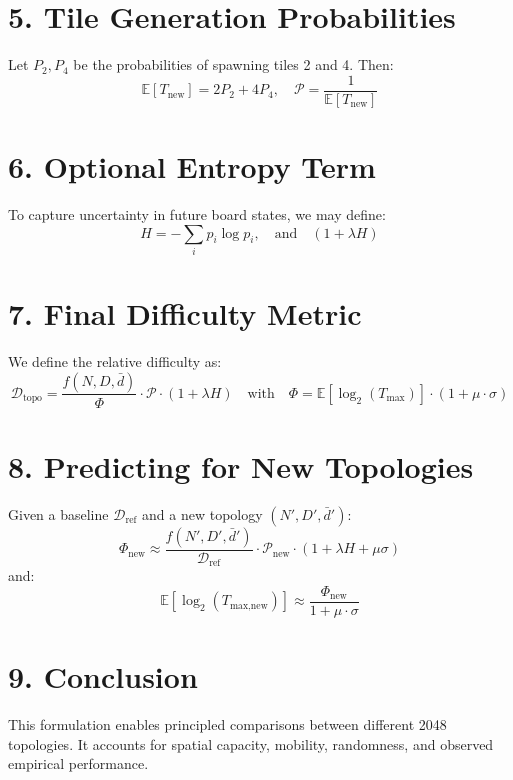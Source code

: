 \documentclass[12pt]{article}
\begin{document}
\section*{5. Tile Generation Probabilities}
Let $P_2, P_4$ be the probabilities of spawning tiles 2 and 4. Then:
\[
\mathbb{E}[T_{\text{new}}] = 2P_2 + 4P_4, \quad \mathcal{P} = \frac{1}{\mathbb{E}[T_{\text{new}}]}
\]

\section*{6. Optional Entropy Term}
To capture uncertainty in future board states, we may define:
\[
H = -\sum_i p_i \log p_i, \quad \text{and} \quad (1 + \lambda H)
\]

\section*{7. Final Difficulty Metric}
We define the relative difficulty as:
\[
\boxed{
\mathcal{D}_{\text{topo}} = \frac{f(N, D, \bar{d})}{\Phi} \cdot \mathcal{P} \cdot (1 + \lambda H)
}
\quad \text{with} \quad \Phi = \mathbb{E}[\log_2(T_{\text{max}})] \cdot (1 + \mu \cdot \sigma)
\]

\section*{8. Predicting for New Topologies}
Given a baseline $\mathcal{D}_{\text{ref}}$ and a new topology $(N', D', \bar{d}')$:
\[
\Phi_{\text{new}} \approx \frac{f(N', D', \bar{d}')}{\mathcal{D}_{\text{ref}}} \cdot \mathcal{P}_{\text{new}} \cdot (1 + \lambda H + \mu \sigma)
\]
and:
\[
\mathbb{E}[\log_2(T_{\text{max,new}})] \approx \frac{\Phi_{\text{new}}}{1 + \mu \cdot \sigma}
\]

\section*{9. Conclusion}
This formulation enables principled comparisons between different 2048 topologies. It accounts for spatial capacity, mobility, randomness, and observed empirical performance.
\end{document}
